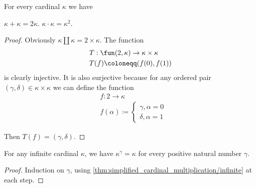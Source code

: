 \begin{proposition}\label{thm:double_and_square_of_cardinal}
  For every cardinal \( \kappa \) we have
  \begin{thmenum}
     \( \kappa + \kappa = 2\kappa \).
     \( \kappa \cdot \kappa = \kappa^2 \).
  \end{thmenum}
\end{proposition}
\begin{proof}
   Obviously \( \kappa \amalg \kappa = 2 \times \kappa \).
   The function
  \begin{equation*}
    \begin{aligned}
      &T: \fun(2, \kappa) \to \kappa \times \kappa \\
      &T(f) \coloneqq (f(0), f(1))
    \end{aligned}
  \end{equation*}
  is clearly injective. It is also surjective because for any ordered pair \( (\gamma, \delta) \in \kappa \times \kappa \) we can define the function
  \begin{equation*}
    \begin{aligned}
      &f: 2 \to \kappa \\
      &f(\alpha) \coloneqq \begin{cases}
        \gamma, \alpha = 0 \\
        \delta, \alpha = 1
      \end{cases}
    \end{aligned}
  \end{equation*}

  Then \( T(f) = (\gamma, \delta) \).
\end{proof}

\begin{corollary}\label{thm:finite_cardinal_exponent}
  For any infinite cardinal \( \kappa \), we have \( \kappa^\gamma = \kappa \) for every positive natural number \( \gamma \).
\end{corollary}
\begin{proof}
  Induction on \( \gamma \), using \cref{thm:simplified_cardinal_multiplication/infinite} at each step.
\end{proof}

\begin{definition}\label{def:strong_limit_cardinal}
\end{definition}

